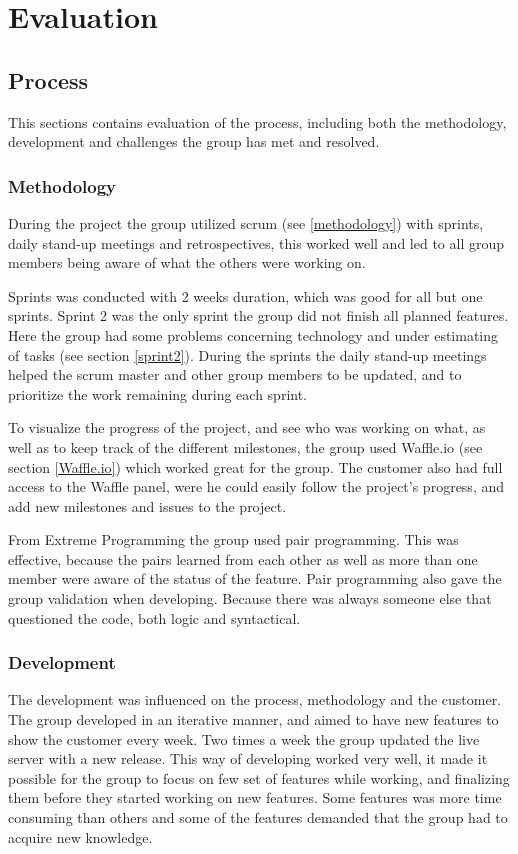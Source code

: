 
\chapter{Evaluation}

\section{Process}
\label{evaluationProcess}
This sections contains evaluation of the process, including both the methodology, development and challenges the group has met and resolved.

\subsection{Methodology}
\label{evaluationMethodology}
During the project the group utilized scrum (see \ref{methodology}) with sprints, daily stand-up meetings and retrospectives, this worked well and led to all group members being aware of what the others were working on. 

Sprints was conducted with 2 weeks duration, which was good for all but one sprints. Sprint 2 was the only sprint the group did not finish all planned features. Here the group had some problems concerning technology and under estimating of tasks (see section \ref{sprint2}). During the sprints the daily stand-up meetings helped the scrum master and other group members to be updated, and to prioritize the work remaining during each sprint. 

To visualize the progress of the project, and see who was working on what, as well as to keep track of the different milestones, the group used Waffle.io (see section \ref{Waffle.io}) which worked great for the group. The customer also had full access to the Waffle panel, were he could easily follow the project's progress, and add new milestones and issues to the project.

From Extreme Programming the group used pair programming. This was effective, because the pairs learned from each other as well as more than one member were aware of the status of the feature. Pair programming also gave the group validation when developing. Because there was always someone else that questioned the code, both logic and syntactical.

\subsection{Development}
The development was influenced on the process, methodology and the customer. The group developed in an iterative manner, and aimed to have new features to show the customer every week. Two times a week the group updated the live server with a new release. This way of developing worked very well, it made it possible for the group to focus on few set of features while working, and finalizing them before they started working on new features. Some features was more time consuming than others and some of the features demanded that the group had to acquire new knowledge. 

